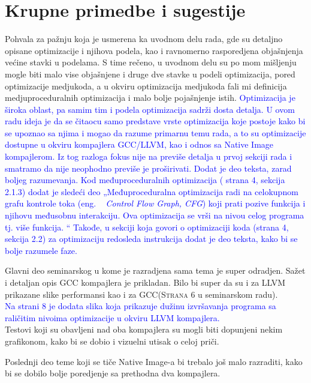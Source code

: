 \documentclass[a4paper]{report}
\newcommand{\odgovor}[1]{\textcolor{blue}{#1}}
\begin{document}
\section{Krupne primedbe i sugestije}

Pohvala za pažnju koja je usmerena ka uvodnom delu rada, gde su detaljno opisane optimizacije i njihova podela, kao i ravnomerno rasporedjena objašnjenja većine stavki u podelama. S time rečeno, u uvodnom delu su po mom mišljenju mogle biti malo vise objašnjene i druge dve stavke u podeli optimizacija, pored optimizacije medjukoda, a u okviru optimizacija medjukoda fali mi definicija medjuproceduralnih optimizacija i malo bolje pojašnjenje istih. 
\odgovor{ Optimizacija je široka oblast, pa samim tim i podela optimizacija sadrži dosta detalja. U ovom radu ideja je da se čitaocu samo predstave vrste optimizacija koje postoje kako bi se 
          upoznao sa njima i mogao da razume primarnu temu rada, a to su optimizacije dostupne u okviru kompajlera GCC/LLVM, kao i odnos sa Native Image kompajlerom.
          Iz tog razloga fokus nije na previše detalja u prvoj sekciji rada i smatramo da nije neophodno previše je proširivati. Dodat je deo teksta, zarad boljeg razumevanja.
          Kod međuproceduralnih optimizacija ( strana 4, sekcija 2.1.3) dodat je sledeći deo 
          „Međuproceduralna optimizacija radi na celokupnom grafu kontrole toka (eng. ~ {\em Control Flow Graph, CFG}) koji prati pozive funkcija i njihovu međusobnu interakciju. 
          Ova optimizacija se vrši na nivou celog programa tj. više funkcija. “ 
          Takođe, u sekciji koja govori o optimizaciji koda (strana 4, sekcija 2.2) za optimizaciju redosleda instrukcija dodat je deo teksta, kako bi se bolje razumele faze. 
}

Glavni deo seminarskog u kome je razradjena sama tema je super odradjen. Sažet i detaljan opis GCC kompajlera je prikladan. Bilo bi super da su i za LLVM prikazane slike performansi kao i za GCC(\textsc{Strana 6} u seminarskom radu). \\
\odgovor{Na strani 8 je dodata slika koja prikazuje dužinu izvršavanja programa sa raličitim nivoima optimizacije u okviru LLVM kompajlera.} \\ Testovi koji su obavljeni nad oba kompajlera su mogli biti dopunjeni nekim grafikonom, kako bi se dobio i vizuelni utisak o celoj priči.

Poslednji deo teme koji se tiče Native Image-a bi trebalo još malo razraditi, kako bi se dobilo bolje poredjenje sa prethodna dva kompajlera. 
\end{document}
